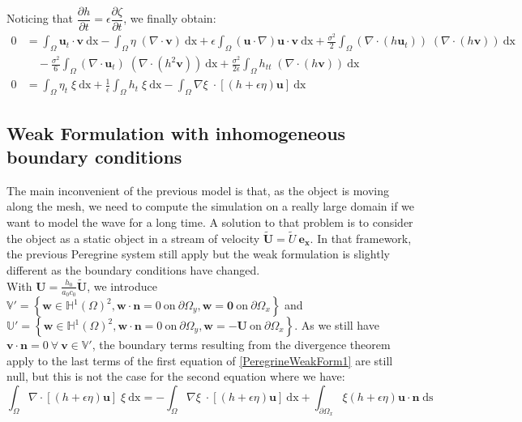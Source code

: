 \documentclass[11pt,a4paper]{article}
\begin{document}
		Noticing that $\dfrac{\partial h}{\partial t} = \epsilon \dfrac{\partial 
		\zeta}{\partial t}$, we finally obtain: 
		\begin{equation}
			\begin{split}
				0 &= \int_{\Omega} \! \mathbf{u}_t \cdot \mathbf{v} \: \mathrm{dx} - \int_{\Omega} \! \eta \; (\nabla \cdot \mathbf{v}) \: \mathrm{dx} + \epsilon \! \int_{\Omega} \! (\mathbf{u} \cdot \nabla ) \mathbf{u} \cdot \mathbf{v} \: \mathrm{dx} + \frac{\sigma^2}{2} \! \int_{\Omega} \!  (\nabla \cdot (h 
\mathbf{u}_t)) \; (\nabla \cdot (h \mathbf{v}) )\: \mathrm{dx} \\ 
				&\quad - \frac{\sigma^2}{6} \! \int_{\Omega} \! (\nabla \cdot \mathbf{u}_t) \; (\nabla  \cdot (h^2  \mathbf{v})) \: \mathrm{dx} + \frac{\sigma^2}{2 \epsilon} \! \int_{\Omega} \!  h_{tt}  \; (\nabla \cdot( h \mathbf{v})) \: \mathrm{dx}\\
				0 &= \int_{\Omega}\! \eta_t \; \xi \: \mathrm{dx} +\frac{1}{\epsilon}\int_{\Omega}\! h_t \; \xi \: \mathrm{dx} -\int_{\Omega}\! \nabla \xi \; \cdot [(h+\epsilon\eta) \mathbf{u}]  \: \mathrm{dx}
			\end{split}
		\end{equation}
		
		\pagebreak
			\subsection{Weak Formulation with inhomogeneous boundary conditions}

				The main inconvenient of the previous model is that, as the object is moving along the mesh, we need to compute the simulation on a really large domain if we want to model the wave for a long time. A solution to that problem is to consider the object as a static object in a stream of velocity $\mathbf{\tilde U} = \tilde{U} \: \mathbf{e_x} $. In that framework, the previous Peregrine system still apply but the weak formulation is slightly different as the boundary conditions have changed.\\
				
				With $\mathbf{U} = \frac{h_0}{a_0 c_0} \mathbf{\tilde{U}}$, we introduce  $\mathbb{V}' = \left\lbrace \mathbf{w} \in \mathbb{H}^1(\Omega)^2, \mathbf{w} \cdot \mathbf{n} = 0 \: \mathrm{on} \: \partial \Omega_y, \mathbf{w} = \mathbf{0} \: \mathrm{on} \: \partial \Omega_x\right\rbrace $ and $\mathbb{U}' = \left\lbrace \mathbf{w} \in \mathbb{H}^1(\Omega)^2, \mathbf{w} \cdot \mathbf{n} = 0 \: \mathrm{on} \: \partial \Omega_y, \mathbf{w} = -\mathbf{U} \: \mathrm{on} \: \partial \Omega_x\right\rbrace $. As we still have $\mathbf{v} \cdot \mathbf{n} = 0 \: \forall \: \mathbf{v} \in \mathbb{V}'$, the boundary terms resulting from the divergence theorem apply to the last terms of the first equation of \eqref{PeregrineWeakForm1} are still null, but this is not the case for the second equation where we have: 
				\begin{equation}
					\int_{\Omega}\! \nabla \cdot [(h+\epsilon\eta) \mathbf{u}] \; \xi \: \mathrm{dx} = - \int_{\Omega}\! \nabla \xi \; \cdot [(h+\epsilon\eta) \mathbf{u}]  \: \mathrm{dx} + \int_{\partial \Omega_x} \! \xi (h+\epsilon \eta) \mathbf{u} \cdot \mathbf{n} \; \mathrm{ds}
				\end{equation}				
			
\end{document}
